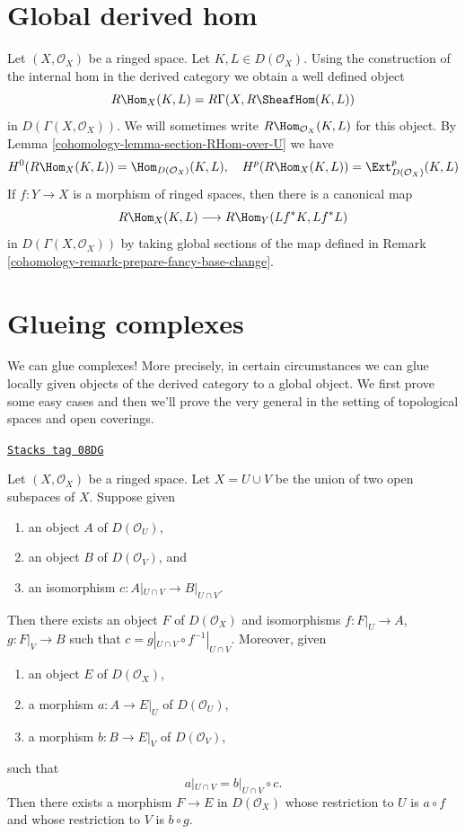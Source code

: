 \section{Global derived hom}
\label{cohomology-section-global-RHom}
Let $(X, \mathcal{O}_X)$ be a ringed space. Let $K, L \in D(\mathcal{O}_X)$.
Using the construction of the internal hom in the derived category we
obtain a well defined object
$$
R\Hom_X(K, L) = R\Gamma(X, R\SheafHom(K, L))
$$
in $D(\Gamma(X, \mathcal{O}_X))$. We will sometimes write
$R\Hom_{\mathcal{O}_X}(K, L)$ for this object.
By Lemma \ref{cohomology-lemma-section-RHom-over-U}
we have
$$
H^0(R\Hom_X(K, L)) = \Hom_{D(\mathcal{O}_X)}(K, L),
\quad
H^p(R\Hom_X(K, L)) = \Ext_{D(\mathcal{O}_X)}^p(K, L)
$$
If $f : Y \to X$ is a morphism of ringed spaces, then there is
a canonical map
$$
R\Hom_X(K, L) \longrightarrow R\Hom_Y(Lf^*K, Lf^*L)
$$
in $D(\Gamma(X, \mathcal{O}_X))$ by taking global sections of the map
defined in Remark \ref{cohomology-remark-prepare-fancy-base-change}.

\section{Glueing complexes}
\label{cohomology-section-glueing-complexes}
We can glue complexes! More precisely, in certain circumstances we can
glue locally given objects of the derived category to a global object.
We first prove some easy cases and then we'll prove the very general
\cite[Theorem 3.2.4]{BBD}
in the setting of topological spaces and open coverings.

\begin{lemma}[Glue]
\label{cohomology-lemma-glue}
\href{https://stacks.math.columbia.edu/tag/08DG}{\texttt{Stacks tag 08DG}}

Let $(X, \mathcal{O}_X)$ be a ringed space. Let $X = U \cup V$ be
the union of two open subspaces of $X$. Suppose given
\begin{enumerate}
\item an object $A$ of $D(\mathcal{O}_U)$,
\item an object $B$ of $D(\mathcal{O}_V)$, and
\item an isomorphism $c : A|_{U \cap V} \to B|_{U \cap V}$.
\end{enumerate}
Then there exists an object $F$ of $D(\mathcal{O}_X)$
and isomorphisms $f : F|_U \to A$, $g : F|_V \to B$ such
that $c = g|_{U \cap V} \circ f^{-1}|_{U \cap V}$.
Moreover, given
\begin{enumerate}
\item an object $E$ of $D(\mathcal{O}_X)$,
\item a morphism $a : A \to E|_U$ of $D(\mathcal{O}_U)$,
\item a morphism $b : B \to E|_V$ of $D(\mathcal{O}_V)$,
\end{enumerate}
such that
$$
a|_{U \cap V}  = b|_{U \cap V} \circ c.
$$
Then there exists a morphism $F \to E$ in $D(\mathcal{O}_X)$
whose restriction to $U$ is $a \circ f$
and whose restriction to $V$ is $b \circ g$.
\end{lemma}

